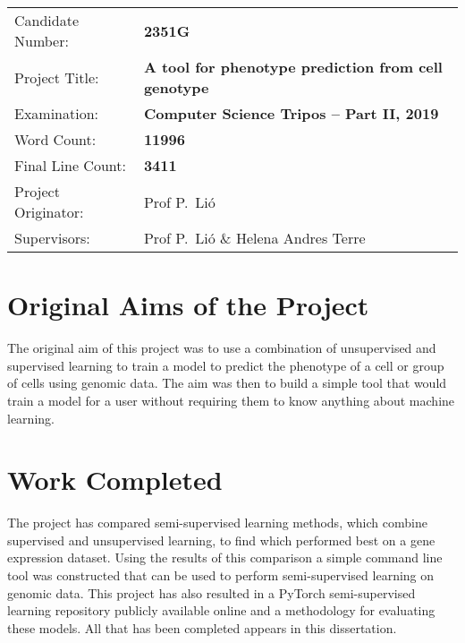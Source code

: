 \documentclass[12pt,a4paper,twoside,openany]{report}
\begin{document}
{\large
\begin{tabular}{ll}
Candidate Number:   & \bf 2351G                   \\
Project Title:      & \bf A tool for phenotype prediction from cell genotype  \\
Examination:        & \bf Computer Science Tripos -- Part II, 2019  \\
Word Count:         & \bf 11996\footnotemark[1]  \\
Final Line Count:   & \bf 3411\\
Project Originator: & Prof P.~Li\'o                   \\
Supervisors:         & Prof P.~Li\'o \& Helena Andres Terre                   \\ 
\end{tabular}
}


\section*{Original Aims of the Project}

The original aim of this project was to use a combination of unsupervised and supervised learning 
to train a model to predict the phenotype of a cell or group of cells using genomic data.
The aim was then to build a simple tool that would train a model for a user without requiring them 
to know anything about machine learning.

\section*{Work Completed}

The project has compared semi-supervised learning methods, which combine supervised and unsupervised learning,
to find which performed best on a gene expression dataset. Using the results of this comparison
a simple command line tool was constructed that can be used to perform semi-supervised learning on genomic data.
This project has also resulted in a PyTorch semi-supervised learning repository publicly available online and a 
methodology for evaluating these models.
All that has been completed appears in this dissertation.

\tableofcontents

\listoffigures


\pagestyle{headings}











\printbibliography


\end{document}
